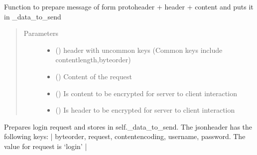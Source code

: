 \documentclass[letterpaper,10pt,english]{sphinxmanual}
\begin{document}
\begin{fulllineitems}
\begin{fulllineitems}
\label{\detokenize{Message:Message.Message._prepare_request_to_send}}
Function to prepare message of form protoheader + header + content and puts it in \_data\_to\_send
\begin{quote}\begin{description}
\item[{Parameters}] \leavevmode\begin{itemize}
\item {} 
 () \textendash{} header with uncommon keys (Common keys include content\sphinxhyphen{}length,byteorder)

\item {} 
 () \textendash{} Content of the request

\item {} 
 () \textendash{} Is content to be encrypted for server to client interaction

\item {} 
 () \textendash{} Is header to be encrypted for server to client interaction

\end{itemize}

\end{description}\end{quote}

\end{fulllineitems}


\begin{fulllineitems}
\label{\detokenize{Message:Message.Message._create_login_request}}
Prepares login request and stores in self.\_data\_to\_send. The jsonheader has the following keys: |
byteorder, request, content\sphinxhyphen{}encoding, username, password. The value for request is ‘login’ |


\end{fulllineitems}
\end{fulllineitems}
\end{document}
